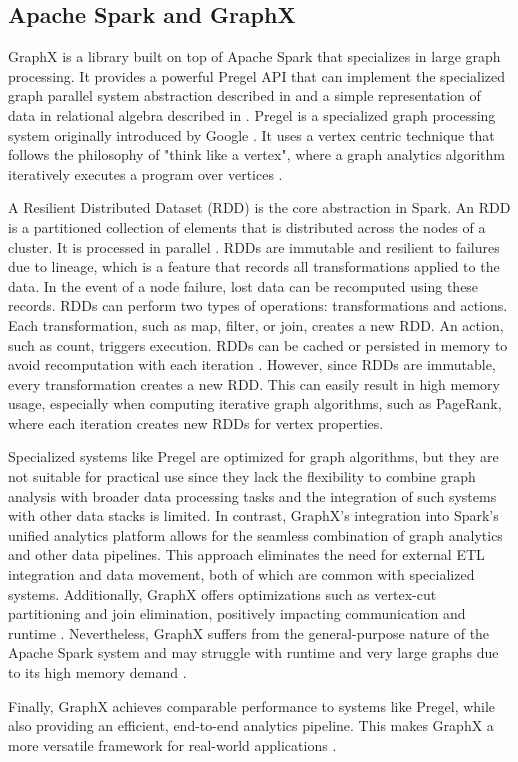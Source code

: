 \subsection{Apache Spark and GraphX}
GraphX is a library built on top of Apache Spark that specializes in large graph processing. It provides a powerful Pregel API that can implement the specialized graph parallel system abstraction described in\cite{malewicz_pregel_2010} and a simple representation of data in relational algebra described in \cite{xin_graphx_2014}. Pregel is a specialized graph processing system originally introduced by Google \cite{malewicz_pregel_2010}. It uses a vertex centric technique that follows the philosophy of "think like a vertex", where a graph analytics algorithm iteratively executes a program over vertices \cite{xin_graphx_2014}. \par

A Resilient Distributed Dataset (RDD) is the core abstraction in Spark. An RDD is a partitioned collection of elements that is distributed across the nodes of a cluster. It is processed in parallel \cite{apache_spark_rdd_2025}. RDDs are immutable and resilient to failures due to lineage, which is a feature that records all transformations applied to the data. In the event of a node failure, lost data can be recomputed using these records. RDDs can perform two types of operations: transformations and actions. Each transformation, such as map, filter, or join, creates a new RDD. An action, such as count, triggers execution. RDDs can be cached or persisted in memory to avoid recomputation with each iteration \cite{chambers_spark_2018}. However, since RDDs are immutable, every transformation creates a new RDD. This can easily result in high memory usage, especially when computing iterative graph algorithms, such as PageRank, where each iteration creates new RDDs for vertex properties. \par

Specialized systems like Pregel are optimized for graph algorithms, but they are not suitable for practical use since they lack the flexibility to combine graph analysis with broader data processing tasks and the integration of such systems with other data stacks is limited. In contrast, GraphX's integration into Spark's unified analytics platform allows for the seamless combination of graph analytics and other data pipelines. This approach eliminates the need for external ETL integration and data movement, both of which are common with specialized systems. Additionally, GraphX offers optimizations such as vertex-cut partitioning and join elimination, positively impacting communication and runtime \cite{xin_graphx_2014}. Nevertheless, GraphX suffers from the general-purpose nature of the Apache Spark system and may struggle with runtime and very large graphs due to its high memory demand \cite{zhuo_distributed_2021}.  \par
Finally, GraphX achieves comparable performance to systems like Pregel, while also providing an efficient, end-to-end analytics pipeline. This makes GraphX a more versatile framework for real-world applications \cite{xin_graphx_2014}.


